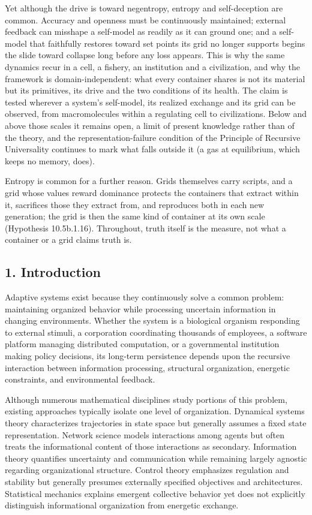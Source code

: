 \documentclass[
]{article}
\begin{document}
Yet although the drive is toward negentropy, entropy and self-deception
are common. Accuracy and openness must be continuously maintained;
external feedback can misshape a self-model as readily as it can ground
one; and a self-model that faithfully restores toward set points its
grid no longer supports begins the slide toward collapse long before any
loss appears. This is why the same dynamics recur in a cell, a fishery,
an institution and a civilization, and why the framework is
domain-independent: what every container shares is not its material but
its primitives, its drive and the two conditions of its health. The
claim is tested wherever a system's self-model, its realized exchange
and its grid can be observed, from macromolecules within a regulating
cell to civilizations. Below and above those scales it remains open, a
limit of present knowledge rather than of the theory, and the
representation-failure condition of the Principle of Recursive
Universality continues to mark what falls outside it (a gas at
equilibrium, which keeps no memory, does).

Entropy is common for a further reason. Grids themselves carry scripts,
and a grid whose values reward dominance protects the containers that
extract within it, sacrifices those they extract from, and reproduces
both in each new generation; the grid is then the same kind of container
at its own scale (Hypothesis 10.5b.1.16). Throughout, truth itself is
the measure, not what a container or a grid claims truth is.

\hypertarget{introduction}{%
\subsection{1. Introduction}\label{introduction}}

Adaptive systems exist because they continuously solve a common problem:
maintaining organized behavior while processing uncertain information in
changing environments. Whether the system is a biological organism
responding to external stimuli, a corporation coordinating thousands of
employees, a software platform managing distributed computation, or a
governmental institution making policy decisions, its long-term
persistence depends upon the recursive interaction between information
processing, structural organization, energetic constraints, and
environmental feedback.

Although numerous mathematical disciplines study portions of this
problem, existing approaches typically isolate one level of
organization. Dynamical systems theory characterizes trajectories in
state space but generally assumes a fixed state representation. Network
science models interactions among agents but often treats the
informational content of those interactions as secondary. Information
theory quantifies uncertainty and communication while remaining largely
agnostic regarding organizational structure. Control theory emphasizes
regulation and stability but generally presumes externally specified
objectives and architectures. Statistical mechanics explains emergent
collective behavior yet does not explicitly distinguish informational
organization from energetic exchange.
\end{document}
